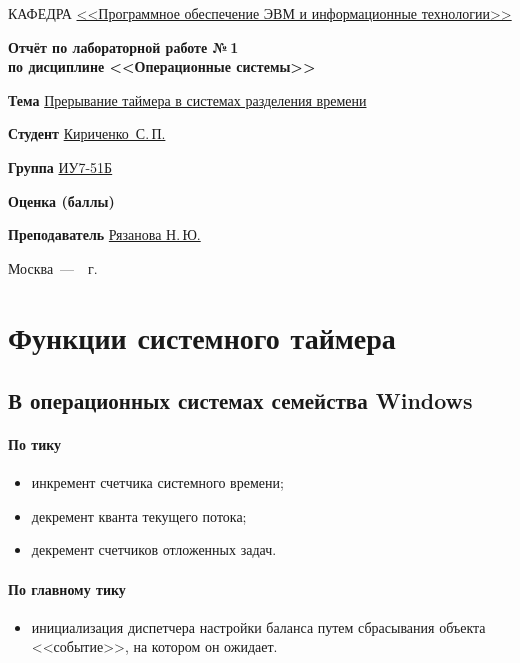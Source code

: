 \documentclass[14pt]{extarticle}
\begin{document}
\begin{titlepage}
\noindent
КАФЕДРА
\uline{<<Программное обеспечение ЭВМ и информационные технологии>> \hfill}

\begin{center}
    \bfseries\large
    Отчёт по лабораторной работе №\,1
    \\
    по дисциплине <<Операционные системы>>
\end{center}

\noindent
\textbf{Тема}
\uline{Прерывание таймера в системах разделения времени \hfill}

\noindent
\textbf{Студент}
\uline{Кириченко~С.\,П. \hfill}

\noindent
\textbf{Группа}
\uline{ИУ7-51Б \hfill}

\noindent
\textbf{Оценка (баллы)}
\uline{\hfill}

\noindent
\textbf{Преподаватель}
\uline{Рязанова Н.\,Ю. \hfill}

\begin{center}
    \vfill
    Москва~---~\the\year~г.
\end{center}

\restoregeometry
\end{titlepage}

\setcounter{page}{2}

\section{Функции системного таймера}

\subsection{В операционных системах семейства Windows}

\paragraph{По тику}
\begin{itemize}
    \item инкремент счетчика системного времени;
    \item декремент кванта текущего потока;
    \item декремент счетчиков отложенных задач.
\end{itemize}

\paragraph{По главному тику}
\begin{itemize}
    \item инициализация диспетчера настройки баланса путем сбрасывания объекта
        <<событие>>, на котором он ожидает.
\end{itemize}
\end{document}
